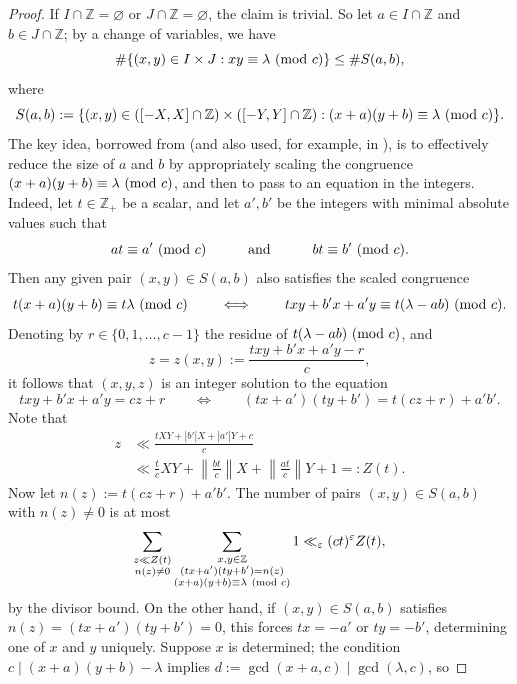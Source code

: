\documentclass[reqno,11pt]{amsart}
\theoremstyle{remark}
\numberwithin{equation}{section}
\newcommand{\Z}{\mathbb{Z}}
\newcommand{\eps}{\varepsilon}
\renewcommand{\emptyset}{\varnothing}
\renewcommand{\pmod}[1]{\ (\textnormal{mod } #1)}
\begin{document}
\begin{proof}
If $I \cap \Z = \emptyset$ or $J \cap \Z = \emptyset$, the claim is trivial. So let $a \in I \cap \Z$ and $b \in J \cap \Z$; by a change of variables, we have
\[
    \#\{(x, y) \in I \times J : xy \equiv \lambda \pmod{c}\} 
    \le
    \# S(a, b),
\]
where
\[
    S(a, b) := \{(x, y) \in ([-X, X] \cap \Z) \times ([-Y, Y] \cap \Z) : (x+a)(y+b) \equiv \lambda \pmod{c}\}.
\]
The key idea, borrowed from \cite[Theorem 1]{cilleruelo2011concentration} (and also used, for example, in \cite[Lemma 5.3]{kerr2023bounds}), is to effectively reduce the size of $a$ and $b$ by appropriately scaling the congruence $(x+a)(y+b) \equiv \lambda \pmod{c}$, and then to pass to an equation in the integers. Indeed, let $t \in \Z_+$ be a scalar, and let $a', b'$ be the integers with minimal absolute values such that
\begin{equation} \label{eq:reduce-a}
    a t \equiv a' \pmod{c}
    \qquad\quad \text{and} \qquad\quad
    b t \equiv b' \pmod{c}.
\end{equation}
Then any given pair $(x, y) \in S(a, b)$ also satisfies the scaled congruence
\[
    t(x+a)(y+b) \equiv t\lambda \pmod{c}
    \qquad 
    \iff 
    \qquad 
    txy + b'x + a'y \equiv t(\lambda - ab) \pmod{c}.
\]
Denoting by $r \in \{0, 1, \ldots, c-1\}$ the residue of $t(\lambda-ab) \pmod{c}$, and 
\[
    z = z(x, y) := \frac{txy + b'x + a'y - r}{c},
\]
it follows that $(x, y, z)$ is an integer solution to the equation
\[
    txy + b'x + a'y = cz + r
    \qquad 
    \Leftrightarrow 
    \qquad 
    (tx + a')(ty + b') = t(cz+r) + a'b'.
\]
Note that
\[
\begin{aligned}
    z &\ll \frac{tXY + |b'|X + |a'| Y + c}{c}
    \\ 
    &\ll 
    \frac{t}{c}XY + \left\| \frac{bt}{c}\right\| X + \left\| \frac{at}{c}\right\| Y + 1 
    =: Z(t).
\end{aligned}
\] 
Now let $n(z) := t(cz+r) + a'b'$. The number of pairs $(x, y) \in S(a, b)$ with $n(z) \neq 0$ is at most
\[
\begin{aligned}
    \sum_{\substack{z \ll Z(t) \\ n(z) \neq 0}}
    \sum_{\substack{x, y \in \Z \\ (tx+a')(ty+b') = n(z) \\ (x+a)(y+b) \equiv \lambda \pmod{c}}}
    1
    \ll_\eps 
    (ct)^\eps Z(t),
\end{aligned}
\]
by the divisor bound. On the other hand, if $(x, y) \in S(a, b)$ satisfies $n(z) = (tx + a')(ty + b') = 0$, this forces $tx = -a'$ or $ty = -b'$, determining one of $x$ and $y$ uniquely. Suppose $x$ is determined; the condition $c \mid (x + a)(y + b) - \lambda$ implies $d := \gcd(x+a, c) \mid \gcd(\lambda, c)$, so 

\end{proof}
\end{document}
